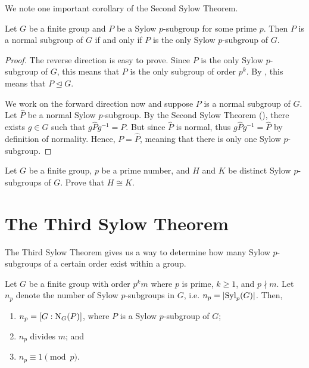 We note one important corollary of the Second Sylow Theorem.
\begin{corollary}\label{corollary-sylow-subgroup-is-normal-if-it-is-unique}
    Let $G$ be a finite group and $P$ be a Sylow $p$-subgroup for some prime $p$. Then $P$ is a normal subgroup of $G$ if and only if $P$ is the only Sylow $p$-subgroup of $G$.
\end{corollary}
\begin{proof}
    The reverse direction is easy to prove. Since $P$ is the only Sylow $p$-subgroup of $G$, this means that $P$ is the only subgroup of order $p^k$. By , this means that $P \unlhd G$.

    We work on the forward direction now and suppose $P$ is a normal subgroup of $G$. Let $\hat{P}$ be a normal Sylow $p$-subgroup. By the Second Sylow Theorem (), there exists $g \in G$ such that $g\hat{P}g^{-1} = P$. But since $\hat{P}$ is normal, thus $g\hat{P}g^{-1} = \hat{P}$ by definition of normality. Hence, $P = \hat{P}$, meaning that there is only one Sylow $p$-subgroup.
\end{proof}

\begin{exercise}
    Let $G$ be a finite group, $p$ be a prime number, and $H$ and $K$ be distinct Sylow $p$-subgroups of $G$. Prove that $H \cong K$.
\end{exercise}

\section{The Third Sylow Theorem}
The Third Sylow Theorem gives us a way to determine how many Sylow $p$-subgroups of a certain order exist within a group.
\begin{theorem}\label{thrm-sylow-3}
    Let $G$ be a finite group with order $p^k m$ where $p$ is prime, $k \geq 1$, and $p \nmid m$. Let $n_p$ denote the number of Sylow $p$-subgroups in $G$, i.e. $n_p = |\mathrm{Syl}_{p}(G)|$. Then,
    \begin{enumerate}
        \item $n_p = [G:\mathrm{N}_{G}(P)]$, where $P$ is a Sylow $p$-subgroup of $G$;
        \item $n_p$ divides $m$; and
        \item $n_p \equiv 1 \pmod p$.
    \end{enumerate}
\end{theorem}

